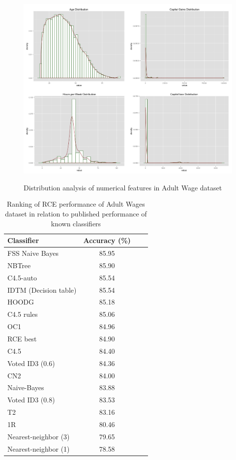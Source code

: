 \documentclass[a4paper,11pt]{scrreprt}
\begin{document}
\begin{figure}[h!]
\centering
\caption{Distribution analysis of numerical features in Adult Wage dataset}
\includegraphics[scale=0.37, trim=0 0 0 0, clip=true] {AdultWageFeatureDistributions.png}
\label{fig:indexes}
\end{figure}

\begin{table}[h!]
\begin{tabular}{l*{2}{c}r}
Classifier & Accuracy (\%)\\
\hline

FSS Naive Bayes & 85.95 \\
NBTree & 85.90 \\
C4.5-auto & 85.54 \\
IDTM (Decision table) & 85.54 \\
HOODG & 85.18 \\
C4.5 rules & 85.06 \\
OC1 & 84.96 \\
\rowcolor{red!25} RCE best & 84.90 \\
C4.5 & 84.40 \\
Voted ID3 (0.6) & 84.36 \\
CN2 & 84.00 \\
Naive-Bayes & 83.88 \\
Voted ID3 (0.8) & 83.53 \\
T2 & 83.16 \\
1R & 80.46 \\
Nearest-neighbor (3) & 79.65 \\
Nearest-neighbor (1) & 78.58

\end{tabular}
\caption{Ranking of RCE performance of Adult Wages dataset in relation to published performance of known classifiers}
\label{tab:classiferrank}
\end{table}
\clearpage
\end{document}
